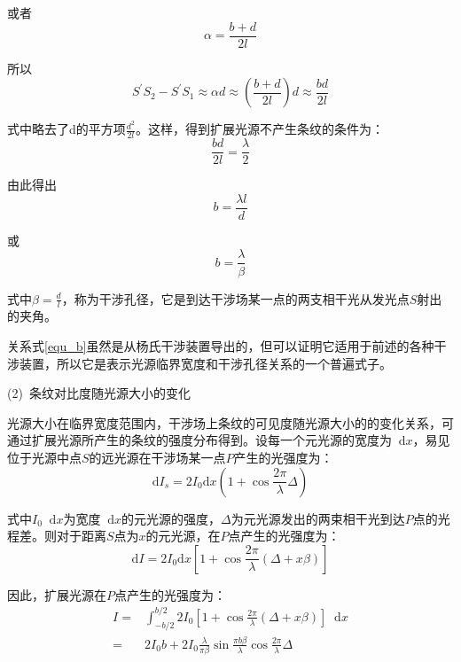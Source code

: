 \documentclass[UTF8]{ctexart}
\newcommand*{\dif}{\mathop{}\!\mathrm{d}}
\begin{document}
\noindent 或者
\begin{equation}
\alpha=\frac{b+d}{2 l}
\end{equation}

\noindent 所以
\begin{equation}
S^{\prime} S_{2}-S^{\prime} S_{1} \approx \alpha d \approx\left(\frac{b+d}{2 l}\right) d \approx \frac{b d}{2 l}
\end{equation}

\noindent 式中略去了d的平方项$ \frac{d^{2}}{2 l} $。这样，得到扩展光源不产生条纹的条件为：
\begin{equation}
	\frac{bd}{2 l}=\frac{\lambda}{2}
\end{equation}

\noindent 由此得出
\begin{equation}
	b=\frac{\lambda l}{d}
\end{equation}

\noindent 或
\begin{equation}
	b=\frac{\lambda}{\beta}\label{equ_b}
\end{equation}

\noindent 式中$ \beta=\frac{d}{l} $，称为干涉孔径，它是到达干涉场某一点的两支相干光从发光点$ S $射出的夹角。
	
	关系式\ref{equ_b}虽然是从杨氏干涉装置导出的，但可以证明它适用于前述的各种干涉装置，所以它是表示光源临界宽度和干涉孔径关系的一个普遍式子。
	
	(2)\ 条纹对比度随光源大小的变化
	
	光源大小在临界宽度范围内，干涉场上条纹的可见度随光源大小的的变化关系，可通过扩展光源所产生的条纹的强度分布得到。设每一个元光源的宽度为$ \dif x $，易见位于光源中点$ S $的远光源在干涉场某一点$ P $产生的光强度为：
	\begin{equation}
	\mathrm{d} I_{s}=2 I_{0} \mathrm{d} x\left(1+\cos \frac{2 \pi}{\lambda} \Delta\right)
	\end{equation}
	
\noindent 式中$ I_{0} \dif x $为宽度$ \dif x $的元光源的强度，$ \Delta $为元光源发出的两束相干光到达$ P $点的光程差。则对于距离$ S $点为$ x $的元光源，在$ P $点产生的光强度为：
	\begin{equation}
	\mathrm{d} I=2 I_{0} \mathrm{d} x\left[1+\cos \frac{2 \pi}{\lambda}(\Delta+x \beta)\right]
	\end{equation}
	
	因此，扩展光源在$ P $点产生的光强度为：
	\begin{equation}
		\begin{aligned}
		I=&\int_{-b / 2}^{b / 2} 2 I_{0}\left[1+\cos \frac{2 \pi}{\lambda}(\Delta+x \beta)\right] \dif x \\
		=&2 I_{0} b+2 I_{0} \frac{\lambda}{\pi \beta} \sin \frac{\pi b \beta}{\lambda} \cos \frac{2 \pi}{\lambda} \Delta
		\end{aligned}
	\end{equation}
	
\end{document}
